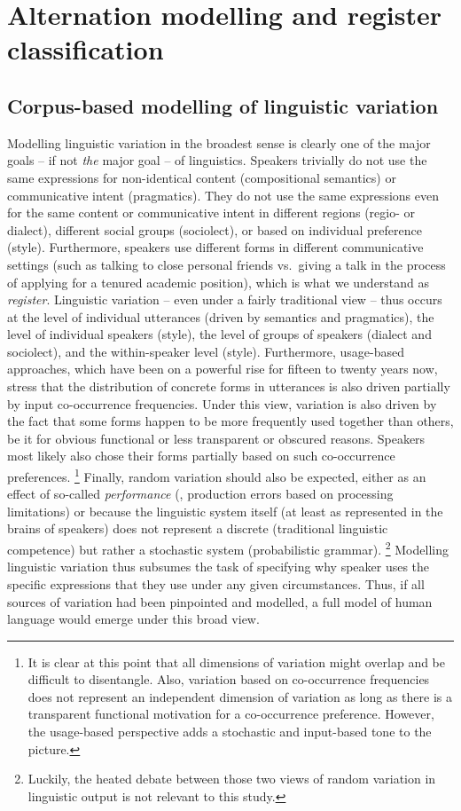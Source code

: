 \section{Alternation modelling and register classification}

\subsection{Corpus-based modelling of linguistic variation}

Modelling linguistic variation in the broadest sense is clearly one of the major goals -- if not \textit{the} major goal -- of linguistics.
Speakers trivially do not use the same expressions for non-identical content (compositional semantics) or communicative intent (pragmatics).
They do not use the same expressions even for the same content or communicative intent in different regions (regio- or dialect), different social groups (sociolect), or based on individual preference (style).
Furthermore, speakers use different forms in different communicative settings (such as talking to close personal friends vs.\ giving a talk in the process of applying for a tenured academic position), which is what we understand as \textit{register}.
Linguistic variation -- even under a fairly traditional view -- thus occurs at the level of individual utterances (driven by semantics and pragmatics), the level of individual speakers (style), the level of groups of speakers (dialect and sociolect), and the within-speaker level (style).
Furthermore, usage-based approaches, which have been on a powerful rise for fifteen to twenty years now, stress that the distribution of concrete forms in utterances is also driven partially by input co-occurrence frequencies.
Under this view, variation is also driven by the fact that some forms happen to be more frequently used together than others, be it for obvious functional or less transparent or obscured reasons.
Speakers most likely also chose their forms partially based on such co-occurrence preferences.%
\footnote{It is clear at this point that all dimensions of variation might overlap and be difficult to disentangle.
Also, variation based on co-occurrence frequencies does not represent an independent dimension of variation as long as there is a transparent functional motivation for a co-occurrence preference.
However, the usage-based perspective adds a stochastic and input-based tone to the picture.}
Finally, random variation should also be expected, either as an effect of so-called \textit{performance} (\ie, production errors based on processing limitations) or because the linguistic system itself (at least as represented in the brains of speakers) does not represent a discrete (traditional linguistic competence) but rather a stochastic system (probabilistic grammar).%
\footnote{Luckily, the heated debate between those two views of random variation in linguistic output is not relevant to this study.}
Modelling linguistic variation thus subsumes the task of specifying why speaker uses the specific expressions that they use under any given circumstances.
Thus, if all sources of variation had been pinpointed and modelled, a full model of human language  would emerge under this broad view.


